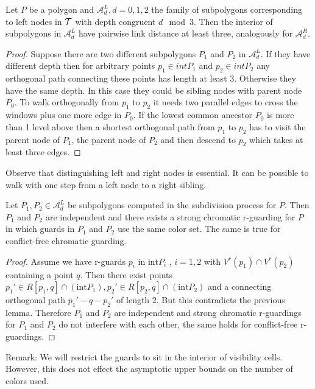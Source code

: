 \documentclass[a4paper,USenglish,numberwithinsect]{lipics}
\newcommand{\A}{\mathcal{A}}
\theoremstyle{plain}
\begin{document}
\begin{lemma}
\label{indep}
Let $P$ be a polygon and  $\A^L_d , d=0,1,2$ the family of subpolygons corresponding to  left nodes in
$\cal{T}$ with depth congruent $d \mod 3$. Then the interior of  subpolygons in 
$\A^L_d$ have  pairwise link distance at least three, analogously for $\A^R_d$.
\end{lemma}
\begin{proof}
Suppose there are two different  subpolygons $P_1$ and $P_2$ in 
$\A^L_d$. If  they have different depth then for arbitrary points
$p_1\in int P_1$ and $p_2\in int P_2$ any orthogonal path connecting
these points has
length
 at least 3. Otherwise they have the same depth. In this  case they
could be sibling nodes with parent node $P_0$. To walk orthogonally 
from $p_1$ to $p_2$ it needs  two parallel edges to cross the windows
plus one more edge in
 $P_0$. If the lowest common ancestor $P_0$ is more than 1 level above
then a shortest orthogonal path from $p_1$ to $p_2$ has to visit the
parent node of $P_1$, the parent node of $P_2$ and then descend to $p_2$
which takes at least three edges.
\end{proof}

Observe that distinguishing left and right nodes is essential. It can be
possible to walk with one step from a left node to a right sibling.

\begin{corollary} Let $P_1,P_2\in \A^L_d$ be subpolygons computed in the subdivision process for $P$.
Then $P_1$ and $P_2$ are independent and there exists a strong chromatic r-guarding for $P$ in which guards in $P_1$ and $P_2$ use the same
color set. The same is true for conflict-free chromatic guarding.
\end{corollary}

\begin{proof} 
Assume we have  r-guards $p_i$ in $\mbox{int} P_i$ , $i=1,2$ with $V^r(p_1)\cap
V^r(p_2)$ containing a point $q$. Then there exist points $p_1'\in
R[p_1,q]\cap (\mbox{int} P_1)  , p_2'\in R[p_2,q]\cap (\mbox{int} P_2)$ and a
connecting orthogonal path
$p_1'-q-p_2'$ of length 2. But  this contradicts the previous lemma.
Therefore  $P_1$ and $P_2$ are independent and strong chromatic r-guardings for $P_1$ and $P_2$ do
not interfere with each other,
the same holds for conflict-free r-guardings.
\end{proof}
Remark: We will restrict the guards to sit in the interior of visibility cells. However, this does not effect the asymptotic upper bounds on the number of colors used.
\end{document}
